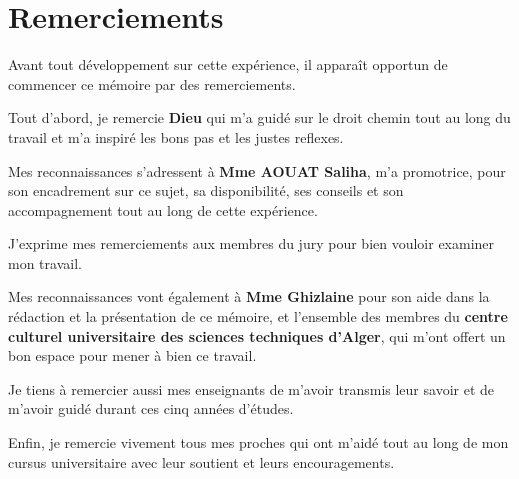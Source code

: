 \begin{titlepage}
\itshape

\chapter*{Remerciements}

Avant tout développement sur cette expérience, il apparaît opportun de
commencer ce mémoire par des remerciements.

Tout d'abord, je remercie \textbf{Dieu} qui m'a guidé sur le droit chemin tout
au long du travail et m'a inspiré les bons pas et les justes reflexes.

Mes reconnaissances s'adressent à \textbf{Mme AOUAT Saliha}, m'a promotrice,
pour son encadrement sur ce sujet, sa disponibilité, ses conseils et son accompagnement
tout au long de cette expérience.

J'exprime mes remerciements aux membres du jury pour bien vouloir examiner mon travail.

Mes reconnaissances vont également à \textbf{Mme Ghizlaine} pour son aide dans
la rédaction et la présentation de ce mémoire, et l'ensemble des membres du
\textbf{centre culturel universitaire des sciences techniques d'Alger}, qui
m'ont offert un bon espace pour mener à bien ce travail.

Je tiens à remercier aussi mes enseignants de m'avoir transmis leur savoir et
de m'avoir guidé durant ces cinq années d'études.

Enfin, je remercie vivement tous mes proches qui ont m'aidé tout au long de mon
cursus universitaire avec leur soutient et leurs encouragements.

\end{titlepage}

